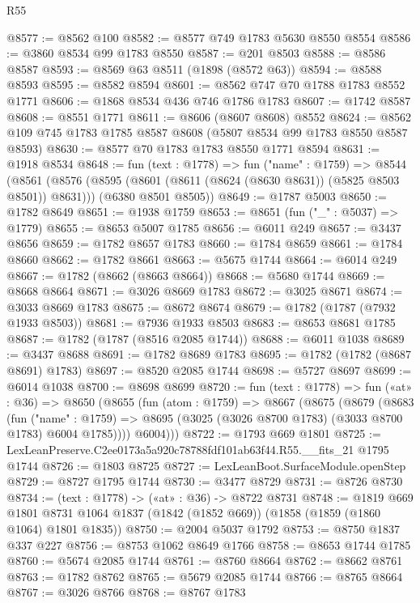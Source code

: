\begin{lexlean}{R55}
\begin{coremodule}
@8577 := @8562 @100
@8582 := @8577 @749 @1783 @5630 @8550 @8554
@8586 := @3860 @8534 @99 @1783 @8550
@8587 := @201 @8503
@8588 := @8586 @8587
@8593 := @8569 @63 @8511 (@1898 (@8572 @63))
@8594 := @8588 @8593
@8595 := @8582 @8594
@8601 := @8562 @747 @70 @1788 @1783 @8552 @1771
@8606 := @1868 @8534 @436 @746 @1786 @1783
@8607 := @1742 @8587
@8608 := @8551 @1771
@8611 := @8606 (@8607 @8608) @8552
@8624 := @8562 @109 @745 @1783 @1785 @8587 @8608 (@5807 @8534 @99 @1783 @8550 @8587 @8593)
@8630 := @8577 @70 @1783 @1783 @8550 @1771 @8594
@8631 := @1918 @8534
@8648 := fun (text : @1778) =>
  fun ("name" : @1759) =>
  @8544
    (@8561
      (@8576 (@8595 (@8601 (@8611 (@8624 (@8630 @8631)) (@5825 @8503 @8501)) @8631)))
      (@6380 @8501 @8505))
@8649 := @1787 @5003
@8650 := @1782 @8649
@8651 := @1938 @1759
@8653 := @8651 (fun ("_" : @5037) => @1779)
@8655 := @8653 @5007 @1785
@8656 := @6011 @249
@8657 := @3437 @8656
@8659 := @1782 @8657 @1783
@8660 := @1784 @8659
@8661 := @1784 @8660
@8662 := @1782 @8661
@8663 := @5675 @1744
@8664 := @6014 @249
@8667 := @1782 (@8662 (@8663 @8664))
@8668 := @5680 @1744
@8669 := @8668 @8664
@8671 := @3026 @8669 @1783
@8672 := @3025 @8671
@8674 := @3033 @8669 @1783
@8675 := @8672 @8674
@8679 := @1782 (@1787 (@7932 @1933 @8503))
@8681 := @7936 @1933 @8503
@8683 := @8653 @8681 @1785
@8687 := @1782 (@1787 (@8516 @2085 @1744))
@8688 := @6011 @1038
@8689 := @3437 @8688
@8691 := @1782 @8689 @1783
@8695 := @1782 (@1782 (@8687 @8691) @1783)
@8697 := @8520 @2085 @1744
@8698 := @5727 @8697
@8699 := @6014 @1038
@8700 := @8698 @8699
@8720 := fun (text : @1778) =>
  fun («at» : @36) =>
  @8650
    (@8655
      (fun (atom : @1759) =>
      @8667
        (@8675
          (@8679
            (@8683
              (fun ("name" : @1759) =>
              @8695 (@3025 (@3026 @8700 @1783) (@3033 @8700 @1783) @6004 @1785))))
          @6004)))
@8722 := @1793 @669 @1801
@8725 := LexLeanPreserve.C2ee0173a5a920c78788fdf101ab63f44.R55.__fits_21 @1795 @1744
@8726 := @1803 @8725
@8727 := LexLeanBoot.SurfaceModule.openStep
@8729 := @8727 @1795 @1744
@8730 := @3477 @8729
@8731 := @8726 @8730
@8734 := (text : @1778) -> («at» : @36) -> @8722 @8731
@8748 := @1819
    @669
    @1801
    @8731
    @1064
    @1837
    (@1842 (@1852 @669))
    (@1858 (@1859 (@1860 @1064) @1801 @1835))
@8750 := @2004 @5037 @1792
@8753 := @8750 @1837 @337 @227
@8756 := @8753 @1062 @8649 @1766
@8758 := @8653 @1744 @1785
@8760 := @5674 @2085 @1744
@8761 := @8760 @8664
@8762 := @8662 @8761
@8763 := @1782 @8762
@8765 := @5679 @2085 @1744
@8766 := @8765 @8664
@8767 := @3026 @8766
@8768 := @8767 @1783

\end{coremodule}
\end{lexlean}
